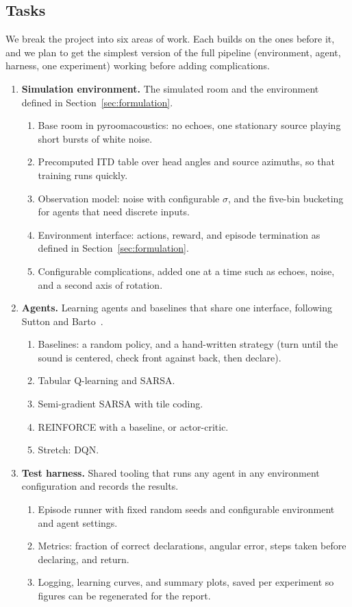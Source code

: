 \documentclass{article}
\begin{document}
\subsection{Tasks}
\label{sec:tasks}

We break the project into six areas of work. Each builds on the ones before it,
and we plan to get the simplest version of the full pipeline (environment,
agent, harness, one experiment) working before adding complications.

\begin{enumerate}
  \item \textbf{Simulation environment.} The simulated room and the environment
  defined in Section~\ref{sec:formulation}.
  \begin{enumerate}
    \item Base room in pyroomacoustics: no echoes, one stationary source
    playing short bursts of white noise.
    \item Precomputed ITD table over head angles and source azimuths, so
    that training runs quickly.
    \item Observation model: noise with configurable $\sigma$, and the
    five-bin bucketing for agents that need discrete inputs.
    \item Environment interface: actions, reward, and episode termination as
    defined in Section~\ref{sec:formulation}.
    \item Configurable complications, added one at a time such as echoes, noise, and a second axis of rotation.
  \end{enumerate}


  \item \textbf{Agents.} Learning agents and baselines that share one
  interface, following Sutton and Barto~\cite{sutton1998reinforcement}.
  \begin{enumerate}
    \item Baselines: a random policy, and a hand-written strategy (turn until
    the sound is centered, check front against back, then declare).
    \item Tabular Q-learning and SARSA.
    \item Semi-gradient SARSA with tile coding.
    \item REINFORCE with a baseline, or actor-critic.
    \item Stretch: DQN.
  \end{enumerate}

  \item \textbf{Test harness.} Shared tooling that runs any agent in any
  environment configuration and records the results.
  \begin{enumerate}
    \item Episode runner with fixed random seeds and configurable environment
    and agent settings.
    \item Metrics: fraction of correct declarations, angular error, steps
    taken before declaring, and return.
    \item Logging, learning curves, and summary plots, saved per experiment so
    figures can be regenerated for the report.
  \end{enumerate}


\end{enumerate}
\end{document}

